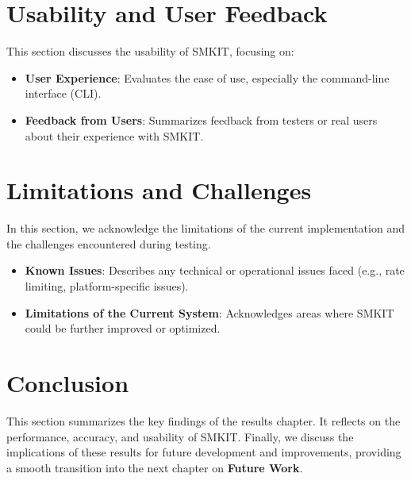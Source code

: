 \section{Usability and User Feedback}
\label{sec:usability_and_feedback}
This section discusses the usability of SMKIT, focusing on:

\begin{itemize}
    \item \textbf{User Experience}: Evaluates the ease of use, especially the command-line interface (CLI).
    \item \textbf{Feedback from Users}: Summarizes feedback from testers or real users about their experience with SMKIT.
\end{itemize}


\section{Limitations and Challenges}
\label{sec:limitations_and_challenges}
In this section, we acknowledge the limitations of the current implementation and the challenges encountered during testing.

\begin{itemize}
    \item \textbf{Known Issues}: Describes any technical or operational issues faced (e.g., rate limiting, platform-specific issues).
    \item \textbf{Limitations of the Current System}: Acknowledges areas where SMKIT could be further improved or optimized.
\end{itemize}


\section{Conclusion}
\label{sec:results_conclusion}
This section summarizes the key findings of the results chapter. It reflects on the performance, accuracy, and usability of SMKIT. Finally, we discuss the implications of these results for future development and improvements, providing a smooth transition into the next chapter on \textbf{Future Work}.
